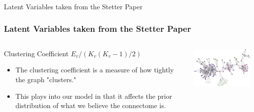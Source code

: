 \documentclass{beamer}
\begin{document}
 
 
 
 
 
 \begin{frame}{Latent Variables taken from the Stetter Paper}
\frametitle{Latent Variables taken from the Stetter Paper}
 \begin{columns}[T]
    \begin{column}{.5\textwidth}
   
\begin{block}{Clustering Coefficient}
        $E_{v}/(K_{v}(K_{v}-1)/2)$
	\begin{itemize}
	\item The clustering coefficient is a measure of how tightly the graph "clusters." 
	\item This plays into our model in that it affects the prior distribution of what we believe the connectome is. 
	\end{itemize} 

   \end{block}





  
\end{column}
    \begin{column}{60mm}
    \begin{block}{}
    \includegraphics[width=55mm]{high_clustering_coefficient.jpg}
   
    \end{block}
 
    \end{column}
\end{columns} 


\end{frame}
 
 
 
\end{document}
